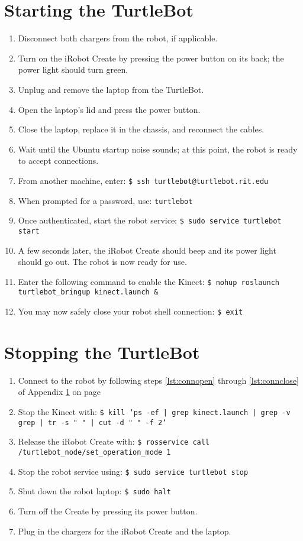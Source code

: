 \documentclass[12pt]{report}
\begin{document}
\section{Starting the TurtleBot}
\label{sec:start}
\begin{enumerate}
\item{Disconnect both chargers from the robot, if applicable.}
\item{Turn on the iRobot Create by pressing the power button on its back; the power light should turn green.}
\item{Unplug and remove the laptop from the TurtleBot.}
\item{Open the laptop's lid and press the power button.}
\item{Close the laptop, replace it in the chassis, and reconnect the cables.}
\item{Wait until the Ubuntu startup noise sounds; at this point, the robot is ready to accept connections.}
\item{\label{lst:connopen}From another machine, enter: \texttt{\$\ ssh turtlebot@turtlebot.rit.edu}}
\item{\label{lst:connclose}When prompted for a password, use: \texttt{turtlebot}}
\item{Once authenticated, start the robot service: \texttt{\$\ sudo service turtlebot start}}
\item{A few seconds later, the iRobot Create should beep and its power light should go out.  The robot is now ready for use.}
\item{Enter the following command to enable the Kinect: \texttt{\$\ nohup roslaunch turtlebot\_bringup kinect.launch \&}}
\item{You may now safely close your robot shell connection: \texttt{\$\ exit}}
\end{enumerate}

\section{Stopping the TurtleBot}
\begin{enumerate}
\item{Connect to the robot by following steps \ref{lst:connopen} through \ref{lst:connclose} of Appendix \ref{sec:start} on page \pageref{sec:start}}
\item{Stop the Kinect with: \texttt{\$\ kill `ps -ef | grep kinect.launch | grep -v grep | tr -s " " | cut -d " " -f 2`}}
\item{Release the iRobot Create with: \texttt{\$\ rosservice call \\ /turtlebot\_node/set\_operation\_mode 1}}
\item{Stop the robot service using: \texttt{\$\ sudo service turtlebot stop}}
\item{Shut down the robot laptop: \texttt{\$\ sudo halt}}
\item{Turn off the Create by pressing its power button.}
\item{Plug in the chargers for the iRobot Create and the laptop.}
\end{enumerate}
\end{document}
